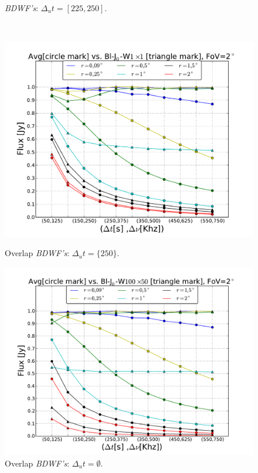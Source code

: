 \documentclass[useAMS,usenatbib]{mn2e}
\begin{document}
\begin{figure}
\begin{minipage}{0.45\linewidth}
{		\textit{BDWF's}: $\Delta_u t= [225, 250]$.}\label{ fig:integ-timefreq-sinc-w100x50-fov2}\end{minipage}\\
\begin{minipage}{0.45\linewidth}\includegraphics[width=1\textwidth]{./Figures/max-integ-timefreq-bessel-w1x1fov2.pdf}\caption{Overlap 
		\textit{BDWF's}: $\Delta_u t=\{250\}$.}\label{fig:fig_4}\end{minipage}
\begin{minipage}{0.45\linewidth}\includegraphics[width=1\textwidth]{./Figures/max-integ-timefreq-bessel-w100x50-fov2.pdf}\caption{Overlap 
		\textit{BDWF's}: $\Delta_u t=\emptyset$.}\label{fig:max-integ-timefreq-bessel-w100x50-fov2}\end{minipage}
\end{figure}
\end{document}
